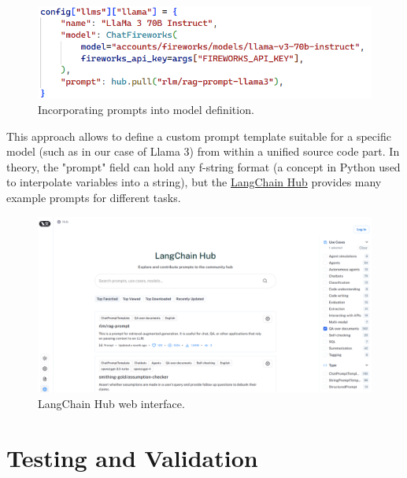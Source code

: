 \begin{figure}[htbp]
    \centering
    \includegraphics[width=\linewidth]{./figures/prompt-template-impl.png}
    \caption{Incorporating prompts into model definition.}
\end{figure}\newline
This approach allows to define a custom prompt template suitable for a specific model (such as in our case of Llama 3) from within a unified source code part. In theory, the "prompt" field can hold any f-string format (a concept in Python used to interpolate variables into a string), but the \href{https://smith.langchain.com/hub}{LangChain Hub} provides many example prompts for different tasks.
\begin{figure}[htbp]
    \centering
    \includegraphics[width=\linewidth]{./figures/langchain-hub.png}
    \caption{LangChain Hub web interface.}
\end{figure}\newline
\newpage

\section{Testing and Validation}
